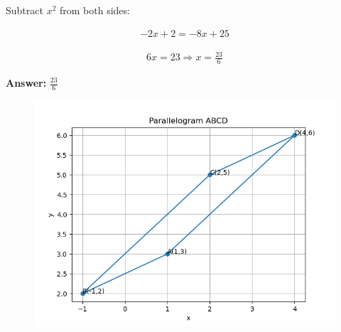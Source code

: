 \documentclass[journal]{IEEEtran}
\begin{document}
Subtract $x^2$ from both sides:

\begin{align}
-2x + 2 = -8x + 25
\end{align}

\begin{align}
6x = 23 \Rightarrow x = \frac{23}{6}
\end{align}

\textbf{Answer:} $ \boxed{\frac{23}{6}} $

\begin{figure}[h!]
    \centering
    \includegraphics[height=0.6\textheight, keepaspectratio]{figs/plotc.png}
    \label{figure_1}
\end{figure}
\end{document}
